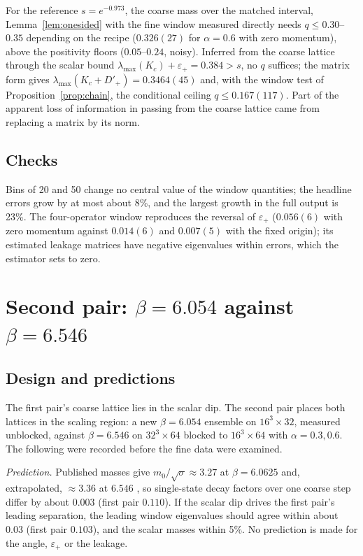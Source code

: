 \documentclass[11pt]{article}
\newcommand{\eps}{\varepsilon}
\newcommand{\lmax}{\lambda_{\max}}
\begin{document}
For the reference $s=e^{-0.973}$, the coarse mass over the matched interval, Lemma~\ref{lem:onesided} with
the fine window measured directly needs $q\le0.30$--$0.35$ depending on the recipe ($0.326(27)$ for
$\alpha=0.6$ with zero momentum), above the positivity floors ($0.05$--$0.24$, noisy). Inferred from the
coarse lattice through the scalar bound $\lmax(K_c)+\eps_+=0.384>s$, no $q$ suffices; the matrix form
gives $\lmax(K_c+D'_+)=0.3464(45)$ and, with the window test of Proposition~\ref{prop:chain}, the
conditional ceiling $q\le0.167(117)$. Part of the apparent loss of information in passing from the coarse
lattice came from replacing a matrix by its norm.

\subsection{Checks}

Bins of 20 and 50 change no central value of the window quantities; the headline errors grow by at
most about 8\%, and the
largest growth in the full output is 23\%. The four-operator window reproduces the reversal of $\eps_+$
($0.056(6)$ with zero momentum against $0.014(6)$ and $0.007(5)$ with the fixed origin); its estimated
leakage matrices have negative eigenvalues within errors, which the estimator sets to zero.

\section{Second pair: \texorpdfstring{$\beta=6.054$}{beta = 6.054} against \texorpdfstring{$\beta=6.546$}{beta = 6.546}}\label{sec:pair2}

\subsection{Design and predictions}

The first pair's coarse lattice lies in the scalar dip. The second pair places both lattices in the
scaling region: a new $\beta=6.054$ ensemble on $16^3\times32$, measured unblocked, against $\beta=6.546$
on $32^3\times64$ blocked to $16^3\times64$ with $\alpha=0.3,0.6$. The following were recorded before the
fine data were examined.

\emph{Prediction.} Published masses give $m_0/\sqrt\sigma\approx3.27$ at $\beta=6.0625$ and, extrapolated,
$\approx3.36$ at $6.546$ \cite{AthenodorouTeper2020}, so single-state decay factors over one coarse step
differ by about $0.003$ (first pair $0.110$). If the scalar dip drives the first pair's leading separation,
the leading window eigenvalues should agree within about $0.03$ (first pair $0.103$), and the scalar masses
within 5\%. No prediction is made for the angle, $\eps_+$ or the leakage.
\end{document}

